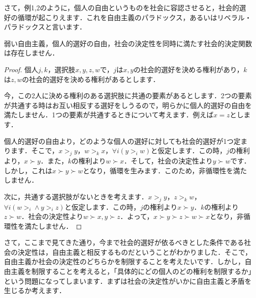 さて，例1,2のように，個人の自由というものを社会に容認させると，社会的選好の循環が起こりえます．これを自由主義のパラドックス，あるいはリベラル・パラドックスと言います．

\begin{thm}[センの不可能性定理]
    弱い自由主義，個人的選好の自由，社会の決定性を同時に満たす社会的決定関数は存在しません．
\end{thm}

\begin{proof}
個人$j,k$，選択肢$x,y,z,w$で，$j$は$x,y$の社会的選好を決める権利があり，$k$は$z,w$の社会的選好を決める権利があるとします．

今，この2人に決める権利のある選択肢に共通の要素があるとします．2つの要素が共通する時はお互い相反する選好をしうるので，明らかに個人的選好の自由を満たしません．1つの要素が共通するときについて考えます．例えば$x = z$とします．

個人的選好の自由より，どのような個人の選好に対しても社会的選好が1つ定まります．そこで，$x >_j y$，$w > _k x$，$\forall i (y >_i w)$と仮定します．この時，$j$の権利より，$x \succ y$．また，$k$の権利より$w \succ x$．そして，社会の決定性より$y \succ w$です．しかし，これは$x \succ y \succ w$となり，循環を生みます．このため，非循環性を満たしません．

次に，共通する選択肢がないときを考えます．$x >_j y$，$z >_k w$，$\forall i (w >_i \land y >_i z)$と仮定します．この時，$j$の権利より$x \succ y$．$k$の権利より$z \succ w$．社会の決定性より$w \succ x,y \succ z$．よって，$x \succ y \succ z \succ w \succ x$となり，非循環性を満たしません．
\end{proof}

さて，ここまで見てきた通り，今まで社会的選好が依るべきとした条件である社会の決定性は，自由主義と相反するものだということがわかりました．そこで，自由主義か社会の決定性のどちらかを制限することを考えたいです．しかし，自由主義を制限することを考えると，「具体的にどの個人のどの権利を制限するか」という問題になってしまいます．まずは社会の決定性がいかに自由主義と矛盾を生じるか考えます．


